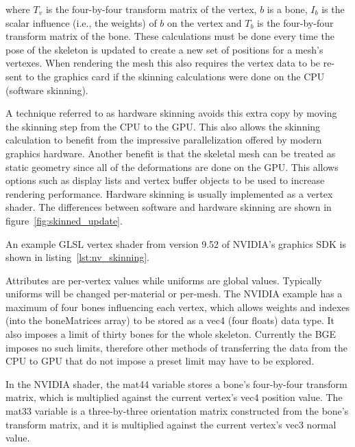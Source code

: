 where $T_v$ is the four-by-four transform matrix of the vertex, $b$ is a bone, $I_b$ is the scalar influence (i.e., the weights) of $b$ on the vertex and $T_b$ is the four-by-four transform matrix of the bone.
These calculations must be done every time the pose of the skeleton is updated to create a new set of positions for a mesh's vertexes.
When rendering the mesh this also requires the vertex data to be re-sent to the graphics card if the skinning calculations were done on the CPU (software skinning).

A technique referred to as hardware skinning avoids this extra copy by moving the skinning step from the CPU to the GPU.
This also allows the skinning calculation to benefit from the impressive parallelization offered by modern graphics hardware.
Another benefit is that the skeletal mesh can be treated as static geometry since all of the deformations are done on the GPU.
This allows options such as display lists and vertex buffer objects\cite{ARB_texture_buffer_object} to be used to increase rendering performance.
Hardware skinning is usually implemented as a vertex shader.
The differences between software and hardware skinning are shown in figure~\ref{fig:skinned_update}.


An example GLSL vertex shader from version 9.52 of NVIDIA's graphics SDK\cite{nvidiasdk} is shown in listing~\ref{lst:nv_skinning}.


Attributes are per-vertex values while uniforms are global values.
Typically uniforms will be changed per-material or per-mesh.
The NVIDIA example has a maximum of four bones influencing each vertex, which allows weights and indexes (into the boneMatrices array) to be stored as a vec4 (four floats) data type.
It also imposes a limit of thirty bones for the whole skeleton.
Currently the BGE imposes no such limits, therefore other methods of transferring the data from the CPU to GPU that do not impose a preset limit may have to be explored.

In the NVIDIA shader, the mat44 variable stores a bone's four-by-four transform matrix, which is multiplied against the current vertex's vec4 position value.
The mat33 variable is a three-by-three orientation matrix constructed from the bone's transform matrix, and it is multiplied against the current vertex's vec3 normal value.

